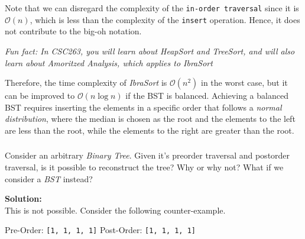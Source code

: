 \documentclass[12pt]{article}
\begin{document}
    Note that we can disregard the complexity of the \texttt{in-order traversal} since it is $\mathcal{O}(n)$, which is less than the complexity of the \texttt{insert} operation. Hence, it does not contribute to the big-oh notation.

    \textit{Fun fact: In CSC263, you will learn about HeapSort and TreeSort, and will also learn about Amoritzed Analysis, which applies to IbraSort}

    Therefore, the time complexity of \textit{IbraSort} is $\mathcal{O}(n^2)$ in the worst case, but it can be improved to $\mathcal{O}(n \log n)$ if the BST is balanced. Achieving a balanced BST requires inserting the elements in a specific order that follows a \textit{normal distribution}, where the median is chosen as the root and the elements to the left are less than the root, while the elements to the right are greater than the root.

    \subsubsection{}
    Consider an arbitrary \textit{Binary Tree}. Given it's preorder traversal and postorder traversal, is it possible to reconstruct the tree? Why or why not? What if we consider a \textit{BST} instead? \\
    \vspace{1cm}

    \textbf{Solution:}\\

    This is not possible. Consider the following counter-example.

    Pre-Order: \texttt{[1, 1, 1, 1]}
    Post-Order: \texttt{[1, 1, 1, 1]}
\end{document}
